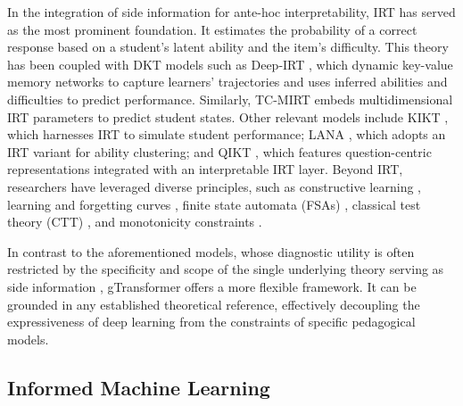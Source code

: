 \documentclass[applsci,article,submit,moreauthors,pdftex]{Definitions/mdpi}
\begin{document}
In the integration of side information for ante-hoc interpretability, IRT \citep{embretson2013item} has served as the most prominent foundation. It estimates the probability of a correct response based on a student's latent ability and the item's difficulty. This theory has been coupled with DKT models such as Deep-IRT \citep{yeung2019deep}, which  dynamic key-value memory networks to capture learners' trajectories and uses inferred abilities and difficulties to predict performance. Similarly, TC-MIRT \citep{su2021time} embeds multidimensional IRT parameters to predict student states. Other relevant models include KIKT \citep{gan2020knowledge}, which harnesses IRT to simulate student performance; LANA \citep{zhou2021lana}, which adopts an IRT variant for ability clustering; and QIKT \citep{chen2023improving}, which features question-centric representations integrated with an interpretable IRT layer. Beyond IRT, researchers have leveraged diverse principles, such as constructive learning \citep{liu2022ability, sun2024progressive}, learning and forgetting curves \citep{zhang2021learning}, finite state automata (FSAs) \citep{zhu2020learning}, classical test theory (CTT) \citep{lee2024monacobert}, and monotonicity constraints \citep{zhang2023counterfactual}. 

In contrast to the aforementioned models, whose diagnostic utility is often restricted by the specificity and scope of the single underlying theory serving as side information \citep{bai2024survey}, gTransformer offers a more flexible framework. It can be grounded in any established theoretical reference, effectively decoupling the expressiveness of deep learning from the constraints of specific pedagogical models. 

\subsection{Informed Machine Learning} \label{sec_iml}
\end{document}
